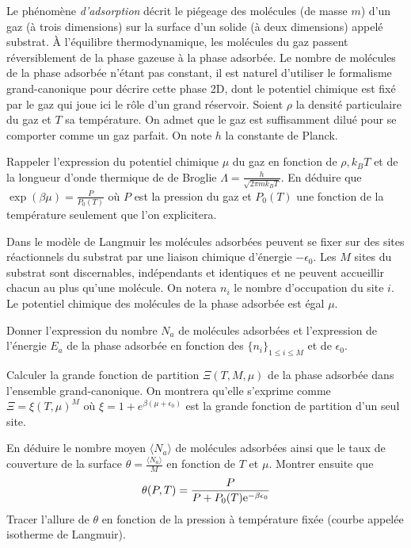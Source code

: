 Le phénomène {\it d'adsorption} décrit le piégeage des molécules (de masse $m$) d'un gaz (à trois dimensions) sur la surface d'un solide (à deux dimensions) appelé substrat.  \`A l'équilibre thermodynamique, les molécules du gaz passent réversiblement de la phase gazeuse à la phase adsorbée.  Le nombre de molécules de la phase adsorbée n'étant pas constant, il est naturel d'utiliser le formalisme grand-canonique pour décrire cette phase 2D, dont le potentiel chimique est fixé par le gaz qui joue ici le rôle d'un grand réservoir. Soient $\rho$ la densité particulaire du gaz et $T$ sa température. On admet que le gaz est suffisamment dilué pour se comporter comme un gaz parfait. On note $h$ la constante de Planck.

\question
Rappeler l'expression du potentiel chimique $\mu$ du gaz en fonction de $\rho, k_B T$ et de la longueur d'onde thermique de de Broglie $\Lambda=\frac{h}{\sqrt{2\pi m k_B T}}$. En déduire que $\exp(\beta \mu)=\frac{P}{P_0(T)}$ où $P$ est la pression du gaz et $P_0(T)$ une fonction de la température seulement que l'on explicitera.

Dans le modèle de Langmuir les molécules adsorbées peuvent se fixer sur des sites réactionnels du substrat par une liaison chimique d'énergie $-\epsilon_0$.  Les $M$ sites du substrat sont discernables, indépendants et identiques et ne peuvent accueillir chacun au plus qu'une molécule.  On notera $n_i$ le nombre d'occupation du site $i$.  Le potentiel chimique des molécules de la phase adsorbée est égal $\mu$.

\question
Donner l'expression du nombre $N_a$ de molécules adsorbées et l'expression de l'énergie $E_a$ de la phase adsorbée en fonction des $\{n_i\}_{1\leq i \leq M}$ et de $\epsilon_0$.

\question
Calculer la grande fonction de partition $\Xi (T,M,\mu)$ de la phase adsorbée dans l'ensemble grand-canonique. On montrera qu'elle s'exprime comme $\Xi=\xi(T,\mu)^M$ où $\xi=1+e^{\beta(\mu+\epsilon_0)}$ est la grande fonction de partition d'un seul site.

\question
En déduire le nombre moyen $\langle N_a \rangle$ de molécules adsorbées ainsi que le taux de couverture de la surface $\theta=\frac{\langle N_a \rangle}{M}$  en fonction de $T$ et $\mu$. Montrer ensuite que
\begin{equation} \label{lang} 
  \displaystyle \theta(P,T)=   \displaystyle{\frac{P} {P+ P_0(T) {\rm e}^{-\beta \epsilon_0}}}
\end{equation}
Tracer l'allure de $\theta$ en fonction de la pression à température
fixée (courbe appelée isotherme de Langmuir).

